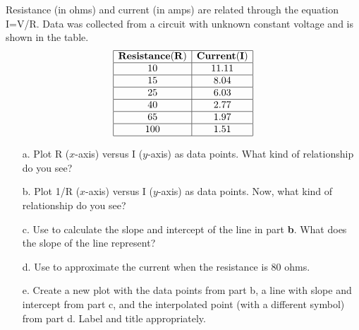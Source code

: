 {Resistance (in ohms) and current (in amps) are related through the equation I=V/R.  Data was collected from a circuit with unknown constant voltage and is shown in the table.
\[
\begin{array}{|c|c|}
\hline
{\bf Resistance (R) } & {\bf Current (I)} \\ \hline
10&	11.11\\ \hline
15&	8.04\\ \hline
25&	6.03\\ \hline
40&	2.77\\ \hline
65&	1.97\\ \hline
100&	1.51\\
\hline
\end{array}
\]
\begin{enumerate}
\item[a.] Plot R ($x$-axis) versus I ($y$-axis) as data points.  What kind of relationship do you see?
\item[b.] Plot 1/R ($x$-axis) versus I ($y$-axis) as data points.  Now, what kind of relationship do you see?
\item[c.] Use  to calculate the slope and intercept of the line in part {\bf b}.  What does the slope of the line represent?
\item[d.] Use  to approximate the current when the resistance is 80 ohms.
\item[e.] Create a new plot with the data points from part b, a line with slope and intercept from part c, and the interpolated point (with a different symbol) from part d.  Label and title appropriately.
\end{enumerate}}
{}